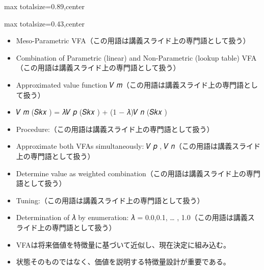 \begin{minipage}[t]{0.58\textwidth}
\begin{adjustbox}{max totalsize={\textwidth}{0.89\textheight},center}
\begin{minipage}{\textwidth}
\end{minipage}
\end{adjustbox}
\end{minipage}


\clearpage
{}
\begin{minipage}[t]{0.405\textwidth}
\begin{adjustbox}{max totalsize={\textwidth}{0.43\textheight},center}
\begin{minipage}{\textwidth}\scriptsize
{}\begin{itemize}
\item Meso-Parametric VFA（この用語は講義スライド上の専門語として扱う）
\item Combination of Parametric (linear) and Non-Parametric (lookup table) VFA（この用語は講義スライド上の専門語として扱う）
\item Approximated value function 𝑉 𝑚（この用語は講義スライド上の専門語として扱う）
\item 𝑉 𝑚 (𝑆𝑘𝑥 ) = 𝜆𝑉 𝑝 (𝑆𝑘𝑥 ) + (1 − 𝜆)𝑉 𝑛 (𝑆𝑘𝑥 )
\item Procedure:（この用語は講義スライド上の専門語として扱う）
\item Approximate both VFAs simultaneously: 𝑉 𝑝 , 𝑉 𝑛（この用語は講義スライド上の専門語として扱う）
\item Determine value as weighted combination（この用語は講義スライド上の専門語として扱う）
\item Tuning:（この用語は講義スライド上の専門語として扱う）
\item Determination of 𝜆 by enumeration: 𝜆 = 0.0,0.1, … , 1.0（この用語は講義スライド上の専門語として扱う）
\end{itemize}\begin{itemize}
\item VFAは将来価値を特徴量に基づいて近似し、現在決定に組み込む。
\item 状態そのものではなく、価値を説明する特徴量設計が重要である。
\end{itemize}
\end{minipage}
\end{adjustbox}
\end{minipage}\hfill
